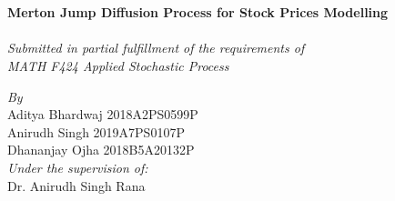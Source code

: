 \documentclass[paper.tex]{subfiles}
\begin{document}
    \begin{titlepage}
        
        \begin{center}
        
            \textsc{\Large }\\[0.5cm] %
        
            \HRule \\[0.4cm] %
            {\Huge \bfseries Merton Jump Diffusion Process for Stock Prices Modelling}\\[0.4cm] %
            \HRule \\[1cm] %
        
            
            \Large \textit{Submitted in partial fulfillment of the
            requirements of \\ MATH F424 Applied Stochastic Process}\\[1cm] %
            
            \begin{center}
                \emph{By}\\[0.4cm]
                Aditya Bhardwaj 2018A2PS0599P\\[0.1cm]
                Anirudh Singh 2019A7PS0107P\\[0.1cm]
                Dhananjay Ojha 2018B5A20132P\\
                \vspace{0.5cm}
                \emph{Under the supervision of:} \\
                \Large Dr. Anirudh Singh Rana \\ %
            \end{center}
    
            \vspace{0.3cm}
            

\end{center}
\end{titlepage}
\end{document}
